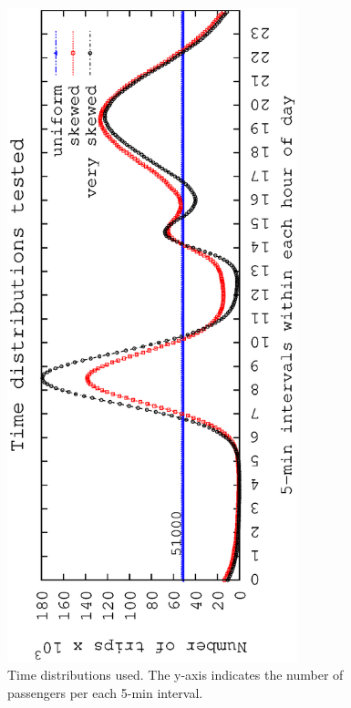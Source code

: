 	\begin{figure}[tbp]
		\begin{center}
			\includegraphics[angle=-90,width=0.75\textwidth]{figures_synt/timedistrib.eps}		
			\caption{Time distributions used. The y-axis indicates the number of passengers per each 5-min interval.}
			\label{fig:distrib}
		\end{center}
		\vspace{-3mm}
	\end{figure}

